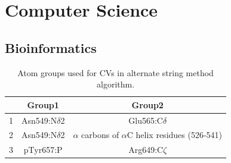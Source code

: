 \newpage
\section{Computer Science}

\subsection{Bioinformatics}

\begin{table}[h]
 \caption{Atom groups used for CVs in alternate string method algorithm.}\vspace{0.5cm}
 \centering
	\begin{tabular}{|c| c| c|}
	\hline
	& \textbf{Group1} & \textbf{Group2} \\
	\hline
	1 & Asn549:N$\delta$2 & Glu565:C$\delta$ \\
	\hline
	2 & Asn549:N$\delta$2 & $\alpha$ carbons of $\alpha$C helix residues (526-541) \\
	\hline
	3 & pTyr657:P & Arg649:C$\zeta$ \\
	\hline
	\end{tabular}
\end{table}

